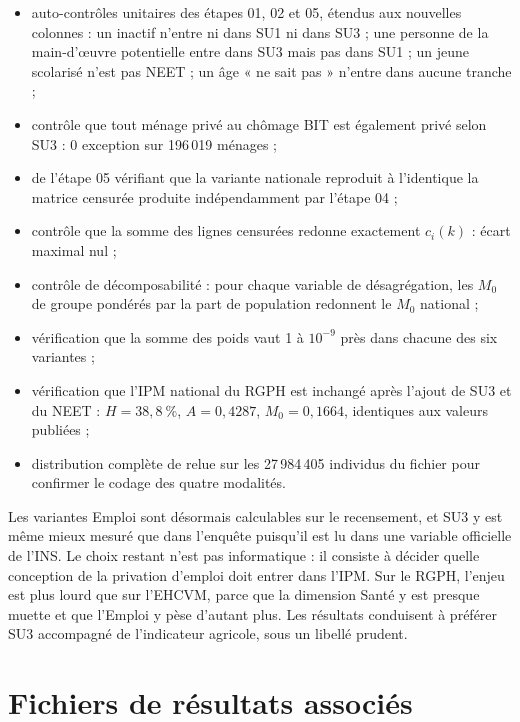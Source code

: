 \documentclass[11pt,a4paper]{article}
\begin{document}
\begin{itemize}
  \item auto-contrôles unitaires des étapes 01, 02 et 05, étendus aux nouvelles colonnes : un
  inactif n'entre ni dans SU1 ni dans SU3 ; une personne de la main-d'{\oe}uvre potentielle
  entre dans SU3 mais pas dans SU1 ; un jeune scolarisé n'est pas NEET ; un âge « ne sait pas »
  n'entre dans aucune tranche ;
  \item contrôle que tout ménage privé au chômage BIT est également privé selon SU3 : 0 exception
  sur 196\,019 ménages ;
  \item {} de l'étape 05 vérifiant que la variante nationale reproduit à l'identique la
  matrice censurée produite indépendamment par l'étape 04 ;
  \item contrôle que la somme des lignes censurées redonne exactement $c_i(k)$ : écart maximal
  nul ;
  \item contrôle de décomposabilité : pour chaque variable de désagrégation, les $M_0$ de groupe
  pondérés par la part de population redonnent le $M_0$ national ;
  \item vérification que la somme des poids vaut 1 à $10^{-9}$ près dans chacune des six
  variantes ;
  \item vérification que l'IPM national du RGPH est inchangé après l'ajout de SU3 et du NEET :
  $H = 38{,}8~\%$, $A = 0{,}4287$, $M_0 = 0{,}1664$, identiques aux valeurs publiées ;
  \item distribution complète de  relue sur les 27\,984\,405 individus du
  fichier pour confirmer le codage des quatre modalités.
\end{itemize}

\begin{retenir}[Conclusion]
Les variantes Emploi sont désormais calculables sur le recensement, et SU3 y est même mieux
mesuré que dans l'enquête puisqu'il est lu dans une variable officielle de l'INS. Le choix
restant n'est pas informatique : il consiste à décider quelle conception de la privation
d'emploi doit entrer dans l'IPM. Sur le RGPH, l'enjeu est plus lourd que sur l'EHCVM, parce que
la dimension Santé y est presque muette et que l'Emploi y pèse d'autant plus. Les résultats
conduisent à préférer SU3 accompagné de l'indicateur agricole, sous un libellé prudent.
\end{retenir}

\section*{Fichiers de résultats associés}
\end{document}
